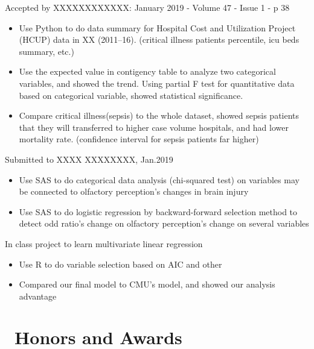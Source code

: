 \documentclass{resume}
\begin{document}
Accepted by XXXXXXXXXXXX: January 2019 - Volume 47 - Issue 1 - p 38
\begin{itemize}
  \item Use Python to do data summary for Hospital Cost and Utilization Project (HCUP) data in XX (2011–16). (critical illness patients percentile, icu beds summary, etc.)
  \item Use the expected value in contigency table to analyze two categorical variables, and showed the trend. Using partial F test for quantitative data based on categorical variable, showed statistical significance.
  \item Compare critical illness(sepsis) to the whole dataset, showed sepsis patients that they will transferred to higher case volume hospitals, and had lower mortality rate. (confidence interval for sepsis patients far higher)
\end{itemize}

Submitted to XXXX XXXXXXXX, Jan.2019
\begin{itemize}
  \item Use SAS to do categorical data analysis (chi-squared test) on variables may be connected to olfactory perception's changes in brain injury 
  \item Use SAS to do logistic regression by backward-forward selection method to detect odd ratio's change on olfactory perception's change on several variables 
\end{itemize}

In class project to learn multivariate linear regression
\begin{itemize}
  \item Use R to do variable selection based on AIC and other  
  \item Compared our final model to CMU's model, and showed our analysis advantage
\end{itemize}


\section{\faHeartO\ Honors and Awards}


%
%
\end{document}
